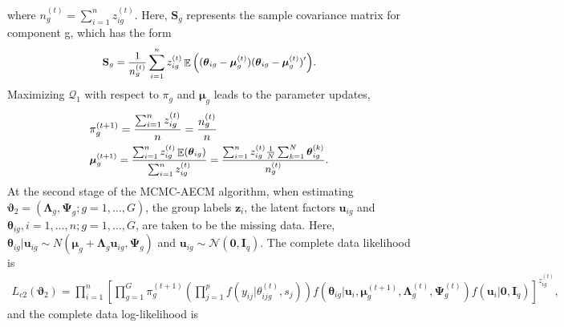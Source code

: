 \documentclass[12pt]{article}
\newcommand{\vecI}{\mathbf{I}}
\newcommand{\vecu}{\mathbf{u}}
\newcommand{\veczero}{\mathbf{0}}
\DeclareMathOperator{\E}{\mathbb{E}}
\begin{document}
where $n_g^{(t)} = \sum_{i=1}^n z_{ig}^{(t)}$. Here, $\mathbf{S}_g$ represents the sample covariance matrix for component g, which has the form
\begin{equation}
\label{sample_covariance_matrix2}
     \small \mathbf{S}_g  = \frac{1}{n_g^{(t)}} \sum_{i=1}^n z_{ig}^{(t)} \E \Big((\boldsymbol{\theta}_{ig} - \boldsymbol{\mu}_g^{(t)}) (\boldsymbol{\theta}_{ig} - \boldsymbol{\mu}_g^{(t)})^{\prime}\Big).
\end{equation}
Maximizing $\mathcal{Q}_1$ with respect to $\pi_g$ and $\boldsymbol{\mu}_g$ leads to the parameter updates,
\begin{equation*}
\begin{split}
	 &\small \pi_g^{(t+1)} = \frac{\sum	_{i=1}^n z_{ig}^{(t)}}{n} = \frac{n_g^{(t)}}{n} \\
     &\small \boldsymbol{\mu}^{(t+1)}_{g} = \frac{\sum	_{i=1}^n z_{ig}^{(t)} \E(\boldsymbol{\theta}_{ig})} {\sum_{i=1}^n z_{ig}^{(t)}} = \frac{\sum	_{i=1}^n z_{ig}^{(t)} \frac{1}{N} \sum_{k=1}^N\boldsymbol{\theta}_{ig}^{(k)}} {n_g^{(t)}}.
\end{split}
\end{equation*}
\noindent At the second stage of the MCMC-AECM algorithm, when estimating $\boldsymbol{\vartheta}_2 =(\boldsymbol{\Lambda}_g, \boldsymbol{\Psi}_g; g = 1, \ldots, G)$, the group labels $\mathbf{z}_i$, the latent factors $\mathbf{u}_{ig}$ and $\boldsymbol{\theta}_{ig},i = 1, \ldots, n; g = 1, \ldots, G$, are taken to be the missing data. Here, $\boldsymbol{\theta}_{ig} | \mathbf{u}_{ig} \sim N(\boldsymbol{\mu}_g + \mathbf{\Lambda}_g \mathbf{u}_{ig}, \mathbf{\Psi}_g)$ and $\vecu_{ig} \sim \mathcal{N}(\veczero,\vecI_q)$. The complete data likelihood is 
\begin{equation*}
\begin{split}
L_{c2}(\boldsymbol{\vartheta}_2) = \prod_{i=1}^{n} \left[\prod_{g=1}^{G} \pi_g^{(t+1)} \left(\prod_{j=1}^{p} f(y_{ij}|\theta_{ijg}^{(t)}, s_j) \right)f(\boldsymbol{\theta}_{ig}| \mathbf{u}_i, \boldsymbol{\mu}_g^{(t+1)},\mathbf{\Lambda}_g^{(t)}, \mathbf{\Psi}_g^{(t)}) f(\mathbf{u}_i| \mathbf{0}, \mathbf{I}_q) \right]^{z_{ig}^{(t)}},
\end{split}
\end{equation*}
and the complete data log-likelihood is
\end{document}
